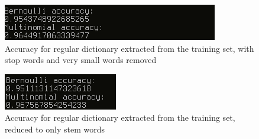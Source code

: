 \documentclass{article}
\begin{document}
	\begin{figure}[h]
		\centering
		\includegraphics{nostop.png}
		\caption{Accuracy for regular dictionary extracted from the training
		set, with stop words and very small words removed}
	\end{figure}
	\begin{figure}[h]
		\centering
		\includegraphics{stem.png}
		\caption{Accuracy for regular dictionary extracted from the training
		set, reduced to only stem words}
	\end{figure}
\end{document}
